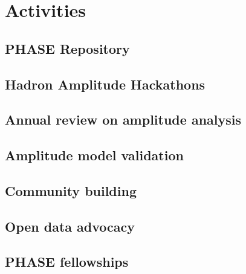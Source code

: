 \section{Activities}

\subsection{PHASE Repository}

\subsection{Hadron Amplitude Hackathons}

\subsection{Annual review on amplitude analysis}

\subsection{Amplitude model validation}

\subsection{Community building}

\subsection{Open data advocacy}

\subsection{PHASE fellowships}